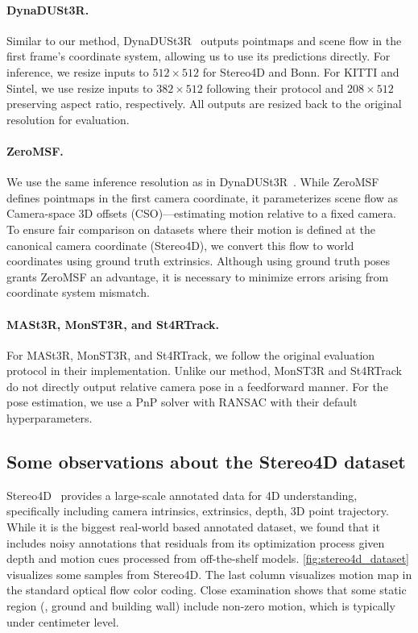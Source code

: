 \paragraph{DynaDUSt3R.} 
Similar to our method, DynaDUSt3R~\citep{Jin:2025:S4D} outputs pointmaps and scene flow in the first frame's coordinate system, allowing us to use its predictions directly.
For inference, we resize inputs to $512\times512$ for Stereo4D and Bonn.
For KITTI and Sintel, we use resize inputs to $382\times512$ following their protocol and $208\times512$ preserving aspect ratio, respectively.
All outputs are resized back to the original resolution for evaluation.

\paragraph{ZeroMSF.}
We use the same inference resolution as in DynaDUSt3R~\citep{Jin:2025:S4D}.
While ZeroMSF~\citep{Liang:2025:ZSM} defines pointmaps in the first camera coordinate, it parameterizes scene flow as Camera-space 3D offsets (CSO)—estimating motion relative to a fixed camera.
To ensure fair comparison on datasets where their motion is defined at the canonical camera coordinate (Stereo4D), we convert this flow to world coordinates using ground truth extrinsics. Although using ground truth poses grants ZeroMSF an advantage, it is necessary to minimize errors arising from coordinate system mismatch. 

\paragraph{MASt3R, MonST3R, and St4RTrack.}
For MASt3R, MonST3R, and St4RTrack, we follow the original evaluation protocol in their implementation. 
Unlike our method, MonST3R and St4RTrack do not directly output relative camera pose in a feedforward manner.
For the pose estimation, we use a PnP solver with RANSAC with their default hyperparameters. 



\subsection{Some observations about the Stereo4D dataset}

Stereo4D~\citep{Jin:2025:S4D} provides a large-scale annotated data for 4D understanding, specifically including camera intrinsics, extrinsics, depth, 3D point trajectory. 
While it is the biggest real-world based annotated dataset, we found that it includes noisy annotations that residuals from its optimization process given depth and motion cues processed from off-the-shelf models.
\cref{fig:stereo4d_dataset} visualizes some samples from Stereo4D.
The last column visualizes motion map in the standard optical flow color coding.
Close examination shows that some static region (\eg, ground and building wall) include non-zero motion, which is typically under centimeter level.

